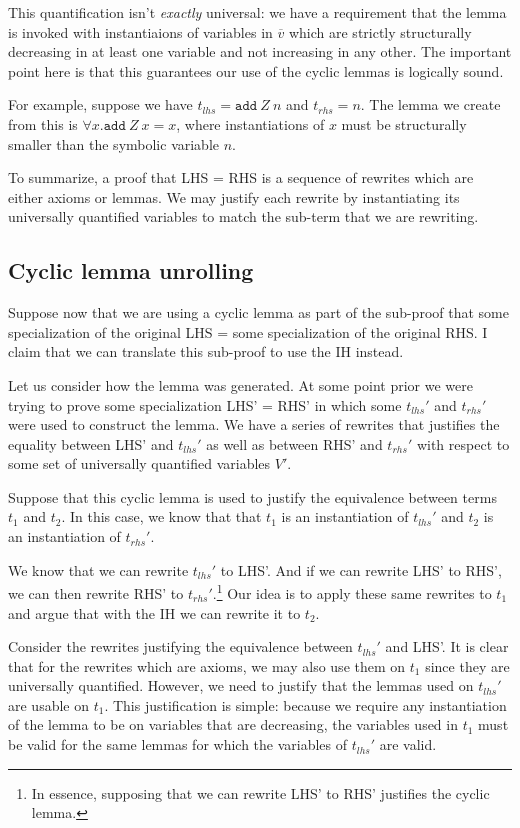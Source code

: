 \documentclass{article}[11pt]
\newcommand{\add}[2]{\texttt{add}\ #1 \ #2}
\begin{document}
This quantification isn't \emph{exactly} universal: we have a requirement that
the lemma is invoked with instantiaions of variables in \(\overline{v}\) which
are strictly structurally decreasing in at least one variable and not increasing
in any other. The important point here is that this guarantees our use of the
cyclic lemmas is logically sound.

For example, suppose we have \(t_{lhs} = \add Z n\) and \(t_{rhs} = n\). The
lemma we create from this is \(\forall x. \add Z x = x\), where instantiations
of \(x\) must be structurally smaller than the symbolic variable \(n\).

To summarize, a proof that LHS = RHS is a sequence of rewrites which are
either axioms or lemmas. We may justify each rewrite by instantiating its
universally quantified variables to match the sub-term that we are rewriting.

\subsection{Cyclic lemma unrolling}

Suppose now that we are using a cyclic lemma as part of the sub-proof that some
specialization of the original LHS = some specialization of the original RHS. I
claim that we can translate this sub-proof to use the IH instead.

Let us consider how the lemma was generated. At some point prior we were trying
to prove some specialization LHS' = RHS' in which some \(t_{lhs}'\) and
\(t_{rhs}'\) were used to construct the lemma. We have a series of rewrites that
justifies the equality between LHS' and \(t_{lhs}'\) as well as between RHS' and
\(t_{rhs}'\) with respect to some set of universally quantified variables
\(V'\).

Suppose that this cyclic lemma is used to justify the equivalence between terms
\(t_{1}\) and \(t_{2}\). In this case, we know that that \(t_{1}\) is an
instantiation of \(t_{lhs}'\) and \(t_{2}\) is an instantiation of \(t_{rhs}'\).

We know that we can rewrite \(t_{lhs}'\) to LHS'. And if we can rewrite LHS' to
RHS', we can then rewrite RHS' to \(t_{rhs}'\).\footnote{In essence, supposing
  that we can rewrite LHS' to RHS' justifies the cyclic lemma.} Our idea is to
apply these same rewrites to \(t_{1}\) and argue that with the IH we can rewrite
it to \(t_{2}\).

Consider the rewrites justifying the equivalence between \(t_{lhs}'\) and LHS'.
It is clear that for the rewrites which are axioms, we may also use them on
\(t_{1}\) since they are universally quantified. However, we need to justify
that the lemmas used on \(t_{lhs}'\) are usable on \(t_{1}\). This justification
is simple: because we require any instantiation of the lemma to be on variables
that are decreasing, the variables used in \(t_{1}\) must be valid for the same
lemmas for which the variables of \(t_{lhs}'\) are valid.
\end{document}
